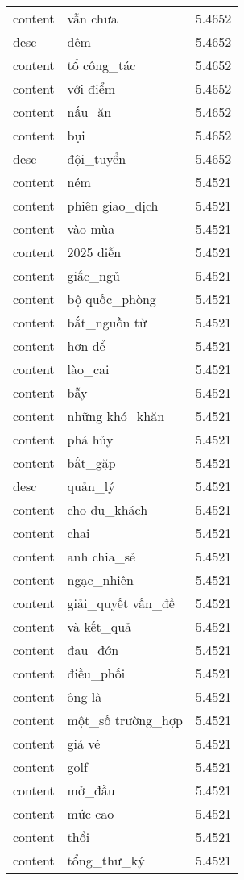 \documentclass{article}
\begin{document}
\begin{tabular}{lll}
content & vẫn chưa & 5.4652\\
desc & đêm & 5.4652\\
content & tổ công\_tác & 5.4652\\
content & với điểm & 5.4652\\
content & nấu\_ăn & 5.4652\\
content & bụi & 5.4652\\
desc & đội\_tuyển & 5.4652\\
content & ném & 5.4521\\
content & phiên giao\_dịch & 5.4521\\
content & vào mùa & 5.4521\\
content & 2025 diễn & 5.4521\\
content & giấc\_ngủ & 5.4521\\
content & bộ quốc\_phòng & 5.4521\\
content & bắt\_nguồn từ & 5.4521\\
content & hơn để & 5.4521\\
content & lào\_cai & 5.4521\\
content & bẫy & 5.4521\\
content & những khó\_khăn & 5.4521\\
content & phá hủy & 5.4521\\
content & bắt\_gặp & 5.4521\\
desc & quản\_lý & 5.4521\\
content & cho du\_khách & 5.4521\\
content & chai & 5.4521\\
content & anh chia\_sẻ & 5.4521\\
content & ngạc\_nhiên & 5.4521\\
content & giải\_quyết vấn\_đề & 5.4521\\
content & và kết\_quả & 5.4521\\
content & đau\_đớn & 5.4521\\
content & điều\_phối & 5.4521\\
content & ông là & 5.4521\\
content & một\_số trường\_hợp & 5.4521\\
content & giá vé & 5.4521\\
content & golf & 5.4521\\
content & mở\_đầu & 5.4521\\
content & mức cao & 5.4521\\
content & thổi & 5.4521\\
content & tổng\_thư\_ký & 5.4521\\

\end{tabular}
\end{document}
